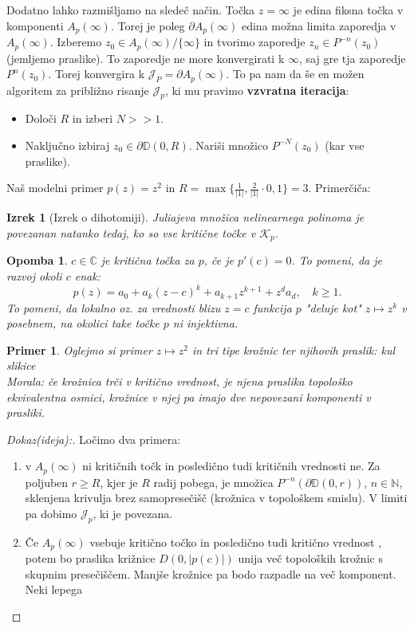 \documentclass{article}
\newtheorem{opomba}{Opomba}
\newtheorem{primer}{Primer}
\newtheorem{izrek}{Izrek}
\newcommand{\C}{\mathbb{C}}
\newcommand{\D}{\mathbb{D}}
\newcommand{\N}{\mathbb{N}}
\begin{document}
Dodatno lahko razmišljamo na sledeč način. Točka $z = \infty$ je edina 
fiksna točka v komponenti $A_p(\infty)$. Torej je poleg $\partial A_p(\infty)$
edina možna limita zaporedja v $A_p(\infty).$ Izberemo $z_0 \in A_p(\infty) \slash \{\infty\}$
in tvorimo zaporedje $z_n \in P^{-n}(z_0)$ (jemljemo praslike). To zaporedje 
ne more konvergirati k $\infty$, saj gre tja zaporedje $P^n(z_0)$. Torej 
konvergira k $\mathcal{J}_P = \partial A_p(\infty)$. To pa nam da še en 
možen algoritem za približno risanje $\mathcal{J}_p$, ki mu pravimo \textbf{vzvratna iteracija}: 
\begin{itemize}
    \item Določi $R$ in izberi $N >> 1$. 
    \item Naključno izbiraj $z_0 \in \partial \D(0, R)$. Nariši množico 
    $P^{-N}(z_0)$ (kar vse praslike). 
\end{itemize}
Naš modelni primer $p(z) = z^2$ in $R = \max\Big\{ \frac{1}{|1|}, \frac{2}{|1|}\cdot 0, 1\} = 3$. 
Primerčiča:\\

\begin{izrek}[Izrek o dihotomiji]
Juliajeva množica nelinearnega polinoma je povezanan natanko tedaj, ko so vse 
kritične točke v $\mathcal{K}_p$.
\end{izrek}

\begin{opomba}
$c\in \C$ je kritična točka za $p$, če je $p'(c) = 0$. To pomeni, da je 
razvoj okoli $c$ enak:
$$
p(z) = a_0 + a_k(z-c)^k + a_{k+1}z^{k+1} + z^d a_d, \quad k \geq 1.
$$
To pomeni, da lokalno oz. za vrednosti blizu $z = c$ funkcija $p$ 
"deluje kot" $z \mapsto z^k$ v posebnem, na okolici take točke $p$ ni
injektivna.
\end{opomba}

\begin{primer}
Oglejmo si primer $z \mapsto z^2$ in tri tipe krožnic ter njihovih praslik: 
kul slikice\\
Morala: če krožnica trči v kritično vrednost, je njena praslika topološko 
ekvivalentna osmici, krožnice v njej pa imajo dve nepovezani komponenti v 
prasliki.
\end{primer}

\begin{proof}[Dokaz(ideja):]
Ločimo dva primera:
\begin{enumerate}
    \item v $A_p(\infty)$ ni kritičnih točk in posledično tudi kritičnih vrednosti ne. 
    Za poljuben $r \geq R$, kjer je $R$ radij pobega, je množica $P^{-n}(\partial \D(0, r))$, 
    $n\in \N$, sklenjena krivulja brez samopresečišč (krožnica v topološkem smislu).
    V limiti pa dobimo $\mathcal{J}_p$, ki je povezana. 
    \item Če $A_p(\infty)$ vsebuje kritično točko in posledično tudi kritično vrednost 
    , potem bo praslika križnice $D(0, |p(c)|)$ unija več topoloških krožnic s 
    skupnim presečiščem. Manjše krožnice pa bodo razpadle na več komponent. \\
    Neki lepega
\end{enumerate}
\end{proof}
\end{document}
